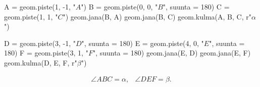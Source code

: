 \begin{esimerkki}
\begin{center}
\begin{kuva}
	A = geom.piste(1, -1, "$A$")
	B = geom.piste(0, 0, "$B$", suunta = 180)
	C = geom.piste(1, 1, "$C$")
	geom.jana(B, A)
	geom.jana(B, C)
	geom.kulma(A, B, C, r"$\alpha$")
	
	D = geom.piste(3, -1, "$D$", suunta = 180)
	E = geom.piste(4, 0, "$E$", suunta = 180)
	F = geom.piste(3, 1, "$F$", suunta = 180)
	geom.jana(E, D)
	geom.jana(E, F)
	geom.kulma(D, E, F, r"$\beta$")
\end{kuva}
\end{center}
\[
\begin{array}{cc}
\displaystyle \angle ABC = \alpha, &
\displaystyle \angle DEF = \beta.
\end{array}
\]
\end{esimerkki}


